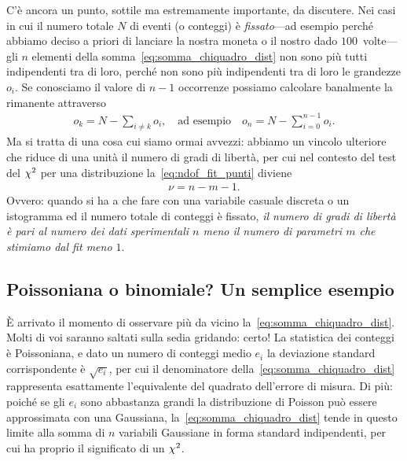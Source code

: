 C'è ancora un punto, sottile ma estremamente importante, da discutere.
Nei casi in cui il numero totale $N$ di eventi (o conteggi) è
\emph{fissato}---ad esempio perché abbiamo deciso a priori di lanciare la
nostra moneta o il nostro dado $100$~volte---gli $n$ elementi della
somma~\eqref{eq:somma_chiquadro_dist} non sono più tutti indipendenti tra di
loro, perché non sono più indipendenti tra di loro le grandezze $o_i$.
Se conosciamo il valore di $n-1$ occorrenze possiamo calcolare banalmente la
rimanente attraverso
\begin{align*}
  o_k = N - \sum_{i \neq k} o_i, \quad \text{ad esempio} \quad
  o_n = N - \sum_{i = 0}^{n - 1} o_i.
\end{align*}
Ma si tratta di una cosa cui siamo ormai avvezzi: abbiamo un vincolo ulteriore
che riduce di una unità il numero di gradi di libertà, per cui nel contesto
del test del $\chi^2$ per una distribuzione la~\eqref{eq:ndof_fit_punti} diviene
\begin{align}\label{eq:ndof_fit_dist}
  \nu = n - m - 1.
\end{align}
Ovvero: quando si ha a che fare con una variabile casuale discreta o un
istogramma ed il numero totale di conteggi è fissato, \emph{il numero di
  gradi di libertà è pari al numero dei dati sperimentali $n$ meno il
  numero di parametri $m$ che stimiamo dal fit meno $1$}.


\subsection{Poissoniana o binomiale? Un semplice esempio}

\`E arrivato il momento di osservare più da vicino
la~\eqref{eq:somma_chiquadro_dist}. Molti di voi saranno saltati sulla sedia
gridando: certo! La statistica dei conteggi è Poissoniana, e dato un numero
di conteggi medio $e_i$ la deviazione standard corrispondente è $\sqrt{e_i}$,
per cui il denominatore della~\eqref{eq:somma_chiquadro_dist} rappresenta
esattamente l'equivalente del quadrato dell'errore di misura. Di più:
poiché se gli $e_i$ sono abbastanza grandi la distribuzione di Poisson può
essere approssimata con una Gaussiana, la~\eqref{eq:somma_chiquadro_dist} tende
in questo limite alla somma di $n$ variabili Gaussiane in forma standard
indipendenti, per cui ha proprio il significato di un $\chi^2$.

